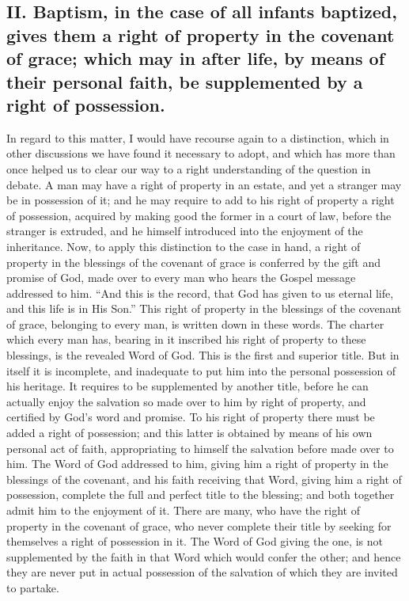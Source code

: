\documentclass[]{book}
\begin{document}
\hypertarget{ii.-baptism-in-the-case-of-all-infants-baptized-gives-them-a-right-of-property-in-the-covenant-of-grace-which-may-in-after-life-by-means-of-their-personal-faith-be-supplemented-by-a-right-of-possession.}{%
\subsection{II. Baptism, in the case of all infants baptized, gives them a right of property in the covenant of grace; which may in after life, by means of their personal faith, be supplemented by a right of possession.}\label{ii.-baptism-in-the-case-of-all-infants-baptized-gives-them-a-right-of-property-in-the-covenant-of-grace-which-may-in-after-life-by-means-of-their-personal-faith-be-supplemented-by-a-right-of-possession.}}

In regard to this matter, I would have recourse again to a distinction, which in other discussions we have found it necessary to adopt, and which has more than once helped us to clear our way to a right understanding of the question in debate. A man may have a right of property in an estate, and yet a stranger may be in possession of it; and he may require to add to his right of property a right of possession, acquired by making good the former in a court of law, before the stranger is extruded, and he himself introduced into the enjoyment of the inheritance. Now, to apply this distinction to the case in hand, a right of property in the blessings of the covenant of grace is conferred by the gift and promise of God, made over to every man who hears the Gospel message addressed to him. ``And this is the record, that God has given to us eternal life, and this life is in His Son.'' This right of property in the blessings of the covenant of grace, belonging to every man, is written down in these words. The charter which every man has, bearing in it inscribed his right of property to these blessings, is the revealed Word of God. This is the first and superior title. But in itself it is incomplete, and inadequate to put him into the personal possession of his heritage. It requires to be supplemented by another title, before he can actually enjoy the salvation so made over to him by right of property, and certified by God's word and promise. To his right of property there must be added a right of possession; and this latter is obtained by means of his own personal act of faith, appropriating to himself the salvation before made over to him. The Word of God addressed to him, giving him a right of property in the blessings of the covenant, and his faith receiving that Word, giving him a right of possession, complete the full and perfect title to the blessing; and both together admit him to the enjoyment of it. There are many, who have the right of property in the covenant of grace, who never complete their title by seeking for themselves a right of possession in it. The Word of God giving the one, is not supplemented by the faith in that Word which would confer the other; and hence they are never put in actual possession of the salvation of which they are invited to partake.
\end{document}
